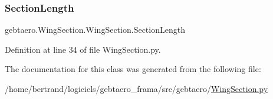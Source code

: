 \subsubsection{\texorpdfstring{Section\+Length}{SectionLength}}
{\footnotesize\ttfamily gebtaero.\+Wing\+Section.\+Wing\+Section.\+Section\+Length}



Definition at line 34 of file Wing\+Section.\+py.



The documentation for this class was generated from the following file\+:\begin{DoxyCompactItemize}
\item 
/home/bertrand/logiciels/gebtaero\+\_\+frama/src/gebtaero/\hyperlink{_wing_section_8py}{Wing\+Section.\+py}\end{DoxyCompactItemize}
